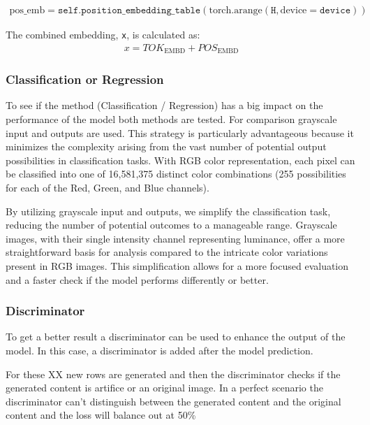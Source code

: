 \begin{align*}
    \text{pos\_emb} = \texttt{self.position\_embedding\_table}(\text{torch.arange}(\texttt{H}, \text{device}=\texttt{device}))
\end{align*}

The combined embedding, \texttt{x}, is calculated as:
\begin{align*}
    x = TOK_{\text{EMBD}} + POS_{\text{EMBD}}
\end{align*}

    

    \subsubsection{Classification or Regression}

    To see if the method (Classification / Regression) has a big impact on the performance of the model both methods are tested. For comparison grayscale input and outputs are used. This strategy is particularly advantageous because it minimizes the complexity arising from the vast number of potential output possibilities in classification tasks. With RGB color representation, each pixel can be classified into one of 16,581,375 distinct color combinations (255 possibilities for each of the Red, Green, and Blue channels).

    By utilizing grayscale input and outputs, we simplify the classification task, reducing the number of potential outcomes to a manageable range. Grayscale images, with their single intensity channel representing luminance, offer a more straightforward basis for analysis compared to the intricate color variations present in RGB images. This simplification allows for a more focused evaluation and a faster check if the model performs differently or better.



    

    \subsubsection{Discriminator}
    To get a better result a discriminator can be used to enhance the output of the model. In this case, a discriminator is added after the model prediction.

    For these XX new rows are generated and then the discriminator checks if the generated content is artifice or an original image. In a perfect scenario the discriminator can't distinguish between the generated content and the original content and the loss will balance out at 50\%


